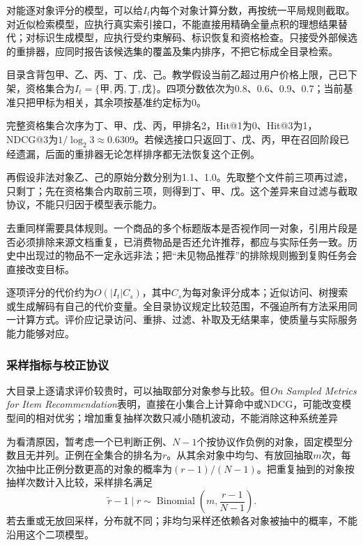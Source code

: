 对能逐对象评分的模型，可以给$I_t$内每个对象计算分数，再按统一平局规则截取。对近似检索模型，应执行真实索引接口，不能直接用精确全量点积的理想结果替代；对标识生成模型，应执行受约束解码、标识恢复和资格检查。只接受外部候选的重排器，应同时报告该候选集的覆盖及集内排序，不把它标成全目录检索。

\begin{example}[过滤、召回与排序分开计数]
目录含背包甲、乙、丙、丁、戊、己。教学假设当前乙超过用户价格上限，己已下架，资格集合为$I_t=\{\text{甲},\text{丙},\text{丁},\text{戊}\}$。四项分数依次为0.8、0.6、0.9、0.7；当前基准只把甲标为相关，其余项按基准约定标为0。

完整资格集合次序为丁、甲、戊、丙，甲排名2，Hit@1为0、Hit@3为1，NDCG@3为$1/\log_2 3\approx0.6309$。若候选接口只返回丁、戊、丙，甲在召回阶段已经遗漏，后面的重排器无论怎样排序都无法恢复这个正例。

再假设非法对象乙、己的原始分数分别为1.1、1.0。先取整个文件前三项再过滤，只剩丁；先在资格集合内取前三项，则得到丁、甲、戊。这个差异来自过滤与截取协议，不能只归因于模型表示能力。
\end{example}

去重同样需要具体规则。一个商品的多个标题版本是否视作同一对象，引用片段是否必须排除来源文档重复，已消费物品是否还允许推荐，都应与实际任务一致。历史中出现过的物品不一定永远非法；把“未见物品推荐”的排除规则搬到复购任务会直接改变目标。

逐项评分的代价约为$O(|I_t|C_s)$，其中$C_s$为每对象评分成本；近似访问、树搜索或生成解码有自己的代价变量。全目录协议规定比较范围，不强迫所有方法采用同一计算方式。评价应记录访问、重排、过滤、补取及无结果率，使质量与实际服务能力能够对应。

\Needspace{110mm}
\subsubsection{采样指标与校正协议}
\label{sec:rs-evaluation-sampled}

大目录上逐请求评价较贵时，可以抽取部分对象参与比较。但\emph{On Sampled Metrics for Item Recommendation}表明，直接在小集合上计算命中或NDCG，可能改变模型间的相对优劣；增加重复抽样次数只减小随机波动，不能消除这种系统差异

为看清原因，暂考虑一个已判断正例、$N-1$个按协议作负例的对象，固定模型分数且无并列。正例在全集合的排名为$r$。从其余对象中均匀、有放回抽取$m$次，每次抽中比正例分数更高的对象的概率为$(r-1)/(N-1)$。把重复抽到的对象按抽样次数计入比较，采样排名满足
\begin{equation}
  \widetilde r-1\mid r
    \sim\operatorname{Binomial}
       \left(m,\frac{r-1}{N-1}\right).
  \label{eq:rs-evaluation-sampled-rank}
\end{equation}
若去重或无放回采样，分布就不同；非均匀采样还依赖各对象被抽中的概率，不能沿用这个二项模型。


